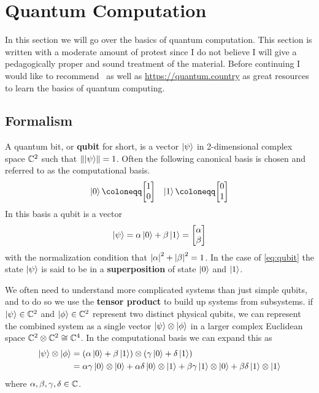 
\section{Quantum Computation}

In this section we will go over the basics of quantum computation.
This section is written with a moderate amount of protest since I do not believe I will give a pedagogically proper and sound treatment of the material.
Before continuing I would like to recommend~\cite{nielsenchuang} as well as \url{https://quantum.country} as great resources to learn the basics of quantum computing.

\subsection{Formalism}

A quantum bit, or \textbf{qubit} for short, is a vector $\ket{\psi}$ in 2-dimensional complex space $\mathbb{C}^2$ such that $\norm{\ket{\psi}} = 1$.
Often the following canonical basis is chosen and referred to as the computational basis.
\begin{align}
    \ket{0} \defeq \mqty[1 \\ 0] & & \ket{1} \defeq \mqty[0 \\ 1]
\end{align}
In this basis a qubit is a vector
\begin{equation}\label{eq:qubit}
    \ket{\psi} = \alpha\ket{0} + \beta\ket{1} = \mqty[\alpha \\ \beta]
\end{equation}
with the normalization condition that $\abs{\alpha}^2 + \abs{\beta}^2 = 1$.
In the case of \cref{eq:qubit} the state $\ket{\psi}$ is said to be in a \textbf{superposition} of state $\ket{0}$ and $\ket{1}$.

We often need to understand more complicated systems than just simple qubits, and to do so we use the \textbf{tensor product} to build up systems from subsystems.
\Eg{} if $\ket{\psi}\in\mathbb{C}^2$ and $\ket{\phi}\in\mathbb{C}^2$ represent two distinct physical qubits, we can represent the combined system as a single vector $\ket{\psi}\otimes \ket{\phi}$ in a larger complex Euclidean space $\mathbb{C}^2\otimes \mathbb{C}^2\cong \mathbb{C}^4$.
In the computational basis we can expand this as
\begin{align}
    \ket{\psi}\otimes \ket{\phi} & = \qty(\alpha\ket{0} + \beta\ket{1})\otimes\qty(\gamma\ket{0} + \delta\ket{1})                                                                \\
                                 & = \alpha\gamma\ket{0}\otimes\ket{0} + \alpha\delta\ket{0}\otimes\ket{1} + \beta\gamma\ket{1}\otimes\ket{0} + \beta\delta\ket{1}\otimes\ket{1}
\end{align}
where $\alpha, \beta, \gamma, \delta \in \mathbb{C}$.

